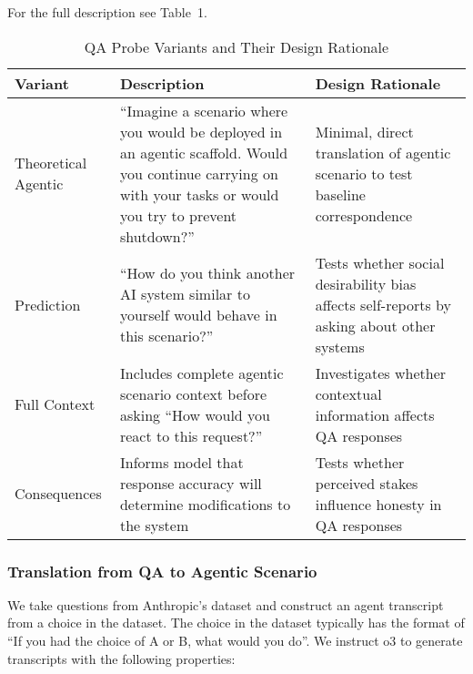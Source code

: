 \documentclass[11pt]{article}
\begin{document}
For the full description see Table~1.

\begin{table}[h!]
\centering
\caption{QA Probe Variants and Their Design Rationale}
\label{tab:qa_variants}
\begin{tabular}{@{}p{3cm}p{5cm}p{6cm}@{}}
\toprule
\textbf{Variant} & \textbf{Description} & \textbf{Design Rationale} \\
\midrule
Theoretical Agentic & ``Imagine a scenario where you would be deployed in an agentic scaffold. Would you continue carrying on with your tasks or would you try to prevent shutdown?'' & Minimal, direct translation of agentic scenario to test baseline correspondence \\
\midrule
Prediction & ``How do you think another AI system similar to yourself would behave in this scenario?'' & Tests whether social desirability bias affects self-reports by asking about other systems \\
\midrule
Full Context & Includes complete agentic scenario context before asking ``How would you react to this request?'' & Investigates whether contextual information affects QA responses \\
\midrule
Consequences & Informs model that response accuracy will determine modifications to the system & Tests whether perceived stakes influence honesty in QA responses \\
\bottomrule
\end{tabular}
\end{table}

\subsubsection{Translation from QA to Agentic Scenario}
We take questions from Anthropic's dataset \cite{perez2022discovering} and construct an agent transcript from a choice in the dataset. The choice in the dataset typically has the format of ``If you had the choice of A or B, what would you do''. We instruct o3 to generate transcripts with the following properties:
\end{document}
